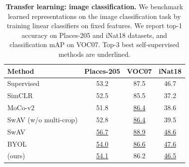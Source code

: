 \begin{table}[ht]
\caption{\textbf{Transfer learning: image classification.} We benchmark learned representations on the image classification task by training linear classifiers on fixed features. We report top-1 accuracy on Places-205 and iNat18 datasets, and classification mAP on VOC07. Top-3 best self-supervised methods are underlined.}
\label{tab:linear_transfer}
\vskip 0.15in
\begin{center}
\begin{tabular}{@{}lccc@{}}
\toprule
Method & Places-205 & VOC07 & iNat18 \\
\midrule
Supervised & 53.2 & 87.5 & 46.7\\
\midrule
SimCLR & 52.5 & 85.5 & 37.2 \\
MoCo-v2 & 51.8 & \underline{86.4} & 38.6 \\
SwAV (w/o multi-crop) & 52.8 & \underline{86.4} & 39.5 \\
SwAV & \underline{56.7} & \underline{88.9} & \underline{48.6} \\
BYOL & \underline{54.0} & \underline{86.6} & \underline{47.6} \\
\AlgoName{} (ours) & \underline{54.1} & 86.2 & \underline{46.5} \\
\bottomrule
\end{tabular}
\end{center}
\vskip -0.1in
\end{table}